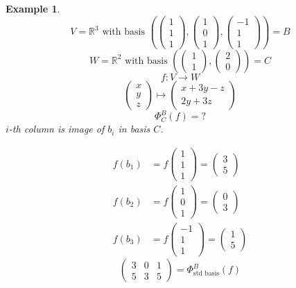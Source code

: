 \documentclass[a4paper,landscape,twocolumn]{article}
\newtheorem{ex}{Example}[section]
\begin{document}
\begin{ex}
  \label{ex-6.55}
  \[
    V = \mathbb R^3 \text{ with basis } \left(
      \begin{pmatrix} 1 \\ 1 \\ 1 \end{pmatrix},
      \begin{pmatrix} 1 \\ 0 \\ 1 \end{pmatrix},
      \begin{pmatrix} -1 \\ 1 \\ 1 \end{pmatrix}
    \right) = B
  \] \[
    W = \mathbb R^2 \text{ with basis } \left(
      \begin{pmatrix} 1 \\ 1 \end{pmatrix},
      \begin{pmatrix} 2 \\ 0 \end{pmatrix}
    \right) = C
  \] \[
    f: V \to W
  \] \[
    \begin{pmatrix} x \\ y \\ z \end{pmatrix}
    \mapsto
    \begin{pmatrix}
      x + 3y - z \\
      2y + 3z
    \end{pmatrix}
  \] \[
    \Phi_C^B(f) = \text{?}
  \]
  $i$-th column is image of $b_i$ in basis $C$.

  \begin{align*}
    f(b_1) &= f\begin{pmatrix} 1 \\ 1 \\ 1 \end{pmatrix} = \begin{pmatrix} 3 \\ 5 \end{pmatrix} \\
    f(b_2) &= f\begin{pmatrix} 1 \\ 0 \\ 1 \end{pmatrix} = \begin{pmatrix} 0 \\ 3 \end{pmatrix} \\
    f(b_3) &= f\begin{pmatrix} -1 \\ 1 \\ 1 \end{pmatrix} = \begin{pmatrix} 1 \\ 5 \end{pmatrix}
  \end{align*}
  \[
    \begin{pmatrix}
      3 & 0 & 1 \\
      5 & 3 & 5
    \end{pmatrix}
    = \Phi_{\text{std basis}}^B(f)
  \]


\end{ex}
\end{document}
